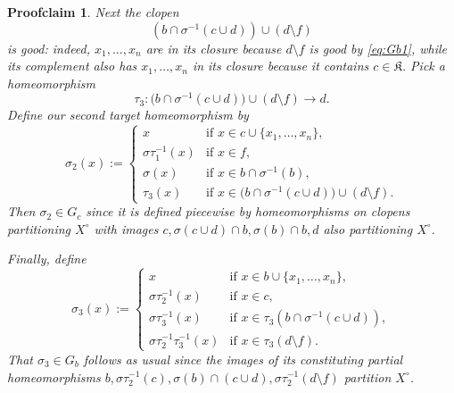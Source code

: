 \documentclass[10pt,a4paper]{amsart}
\newtheorem{proofclaim}{Proofclaim}
\begin{document}
\begin{proofclaim}
Next the clopen
\[
(b\cap \sigma^{-1}(c\cup d))\cup (d\setminus f)
\]
is good: indeed, $x_1,\dots,x_n$ are in its closure
because $d\setminus f$ is good by \eqref{eq:Gb1}, while its complement also has $x_1,\dots,x_n$ in its closure
because it contains $c\in\mathfrak{K}$.
Pick a homeomorphism
\begin{equation*}
\tau_3\colon \bigl(b\cap \sigma^{-1}(c\cup d)\bigr)\cup (d\setminus f)\rightarrow d.
\end{equation*}
 Define our second target homeomorphism
 by
 \begin{equation}
 \label{eq:Gb11}
 \sigma_2(x):= 
 \begin{cases}
 x & \text{if } x\in c \cup \{x_1,\dots,x_n\},\\
 \sigma\tau_1^{-1}(x) & \text{if } x\in f,\\
 \sigma(x) & \text{if } x\in b\cap \sigma^{-1}(b),\\
 \tau_3(x) & \text{if } x\in \bigl(b\cap \sigma^{-1}(c\cup d)\bigr)\cup (d\setminus f).
 \end{cases}
 \end{equation}
 Then $\sigma_2\in G_c$ since it is defined piecewise by homeomorphisms on clopens partitioning $X^\circ$ with
 images $c, \sigma(c\cup d)\cap b, \sigma(b)\cap b, d$ also partitioning $X^\circ$.
 
 Finally, define
 \begin{equation}
 \label{eq:Gb13}
 \sigma_3(x) := 
 \begin{cases}
 x & \text{if } x\in b \cup \{x_1,\dots,x_n\},\\
 \sigma\tau_2^{-1}(x) & \text{if } x\in c,\\
 \sigma\tau_3^{-1}(x) & \text{if } x\in \tau_3(b\cap \sigma^{-1}(c\cup d)),\\
 \sigma\tau_2^{-1}\tau_3^{-1}(x) & \text{if } x\in \tau_3(d\setminus f).
 \end{cases}
 \end{equation}
 That $\sigma_3\in G_b$ follows as usual since the images of its constituting partial homeomorphisms
 $b, \sigma\tau_2^{-1}(c), \sigma(b)\cap (c\cup d), \sigma\tau_2^{-1}(d\setminus f)$ partition $X^\circ$.
 

\end{proofclaim}
\end{document}
